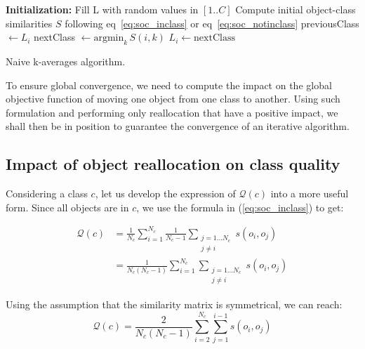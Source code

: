 \documentclass[a4paper,twoside]{article}
\begin{document}
\begin{algorithm}
	\label{algo:naive-kaverages}
	\SetAlgoLined
	\BlankLine	
	\textbf{Initialization:} 
		Fill L with random values in $[1..C]$\;
		Compute initial object-class similarities $S$ following eq~\ref{eq:soc_inclass} or eq~\ref{eq:soc_notinclass}\;
	\BlankLine	
	 {
		 {
			previousClass $\leftarrow L_i$\;
			nextClass $\leftarrow \mathrm{argmin}_k\, S(i, k)$
			 {
				$L_i \leftarrow \mathrm{nextClass}$\;
			}
		}
	}
	\BlankLine
	\caption{Naive k-averages algorithm.}
\end{algorithm}

To ensure global convergence, we need to compute the impact on the global objective function of moving one object from one class to another. Using such formulation and performing only reallocation that have a positive impact, we shall then be in position to guarantee the convergence of an iterative algorithm. 

\subsection{Impact of object reallocation on class quality}

Considering a class $c$, let us develop the expression of $\mathcal{Q}(c)$ into a more useful form. Since all objects are in $c$, we use the formula in (\ref{eq:soc_inclass}) to get:

\begin{equation}
  \begin{aligned}
    \mathcal{Q}\left(c\right) & = \frac{1}{N_c} \sum_{i=1}^{N_c} \frac{1}{N_c-1} \sum_{\substack{j=1 \ldots N_c\\j \neq i}} s\left(o_i, o_j\right) \\
                              & = \frac{1}{N_c(N_c-1)} \sum_{i=1}^{N_c} \sum_{\substack{j=1 \ldots N_c\\j \neq i}} s\left(o_i, o_j\right)
  \end{aligned}
\end{equation}

Using the assumption that the similarity matrix is symmetrical, we can reach: %
\begin{equation}
    \mathcal{Q}\left(c\right) = \frac{2}{N_c(N_c-1)} \sum_{i=2}^{N_c} \sum_{j=1}^{i-1} s\left(o_i, o_j\right)
    \label{eq:classQuality}
\end{equation}
\end{document}
